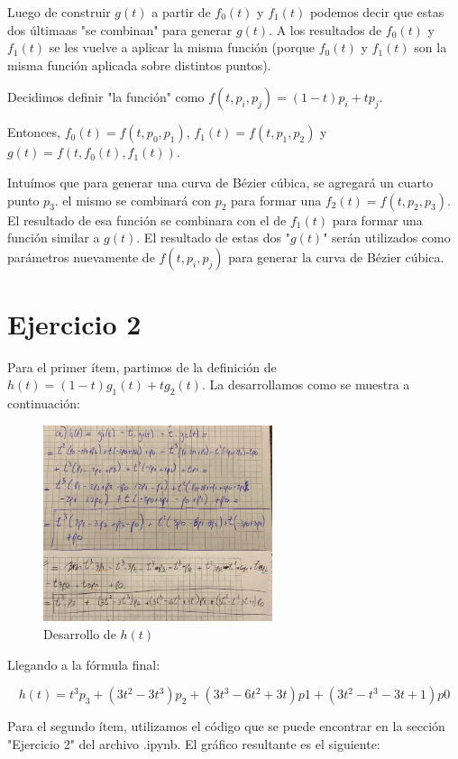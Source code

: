 \documentclass{article}
\begin{document}
Luego de construir $g(t)$ a partir de $f_0(t)$ y $f_1(t)$ podemos decir que estas dos últimaas "se combinan" para generar  $g(t)$. A los resultados de $f_0(t)$ y $f_1(t)$ se les vuelve a aplicar la misma función (porque $f_0(t)$ y $f_1(t)$ son la misma función aplicada sobre distintos puntos).

Decidimos definir "la función" como $f(t, p_i, p_j) = (1-t) p_i + t p_j$.

Entonces, $f_0(t) = f(t, p_0, p_1)$, $f_1(t) = f(t, p_1, p_2)$ y $g(t) = f(t, f_0(t), f_1(t))$.

Intuímos que para generar una curva de Bézier cúbica, se agregará un cuarto punto $p_3$. el mismo se combinará con $p_2$ para formar una $f_2(t) = f(t, p_2, p_3)$. El resultado de esa función se combinara con el de $f_1(t)$ para formar una función similar a $g(t)$. El resultado de estas dos "$g(t)$" serán utilizados como parámetros nuevamente de $f(t, p_i, p_j)$ para generar la curva de Bézier cúbica.

\section*{Ejercicio 2}

Para el primer ítem, partimos de la definición de $h(t) = (1 - t)g_1(t) + t g_2(t)$. La desarrollamos como se muestra a continuación:

\begin{figure}[H]
    \centering
    \includegraphics[width=0.6\textwidth]{imagenes/2a.png}
    \caption{Desarrollo de $h(t)$}
    \label{fig:ejemplo}
\end{figure}

Llegando a la fórmula final:

$$
h(t) = t^3p_3 + (3t^2-3t^3)p_2 + (3t^3-6t^2+3t)p1 + (3t^2-t^3-3t+1)p0
$$

Para el segundo ítem, utilizamos el código que se puede encontrar en la sección "Ejercicio 2" del archivo .ipynb. El gráfico resultante es el siguiente:
\end{document}
